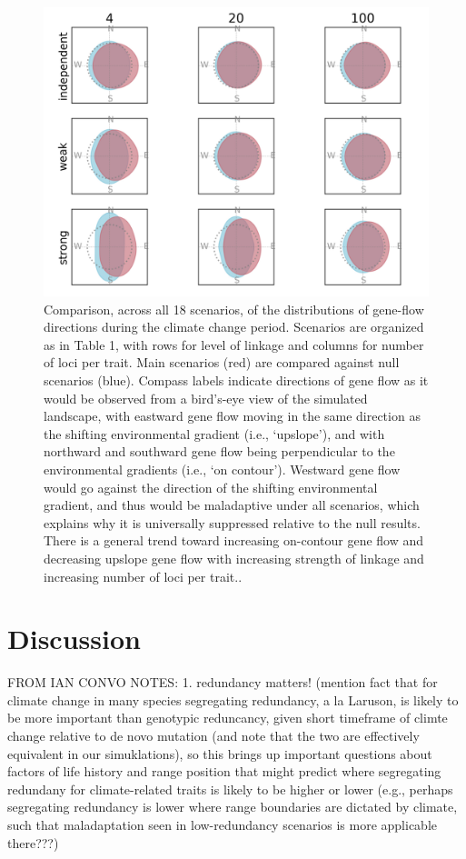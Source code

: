 \documentclass[9pt,twocolumn,twoside,lineno]{pnas-new}
\begin{document}
\begin{figure}
\centering
\includegraphics[width=17.8cm]{gene_flow.jpg}
\caption{Comparison, across all 18 scenarios, of the distributions of gene-flow directions during the climate change period. Scenarios are organized as in Table 1, with rows for level of linkage and columns for number of loci per trait. Main scenarios (red) are compared against null scenarios (blue). Compass labels indicate directions of gene flow as it would be observed from a bird’s-eye view of the simulated landscape, with eastward gene flow moving in the same direction as the shifting environmental gradient (i.e., ‘upslope’), and with northward and southward gene flow being perpendicular to the environmental gradients (i.e., ‘on contour’). Westward gene flow would go against the direction of the shifting environmental gradient, and thus would be maladaptive under all scenarios, which explains why it is universally suppressed relative to the null results. There is a general trend toward increasing on-contour gene flow and decreasing upslope gene flow with increasing strength of linkage and increasing number of loci per trait..
}
\label{fig:gene_flow}
\end{figure}


\section*{Discussion}

FROM IAN CONVO NOTES:
 1. redundancy matters! (mention fact that for climate change in many species segregating redundancy, a la Laruson, is likely to be more important than genotypic reduncancy, given short timeframe of climte change relative to de novo mutation (and note that the two are effectively equivalent in our simuklations), so this brings up important questions about factors of life history and range position that might predict where segregating redundany for climate-related traits is likely to be higher or lower (e.g., perhaps segregating redundancy is lower where range boundaries are dictated by climate, such that maladaptation seen in low-redundancy scenarios is more applicable there???)
\end{document}
